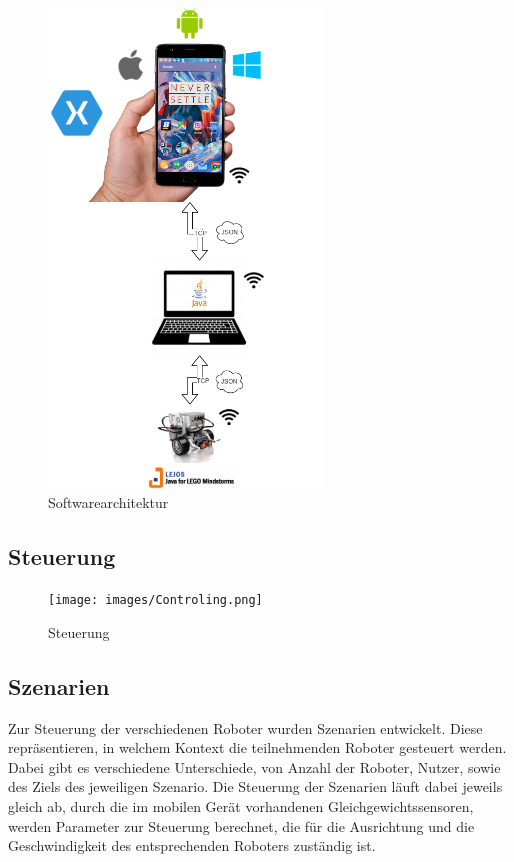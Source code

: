 \newpage
\begin{verbatim}
\end{verbatim}
\begin{figure}[h]
	\centering
	\includegraphics[width=0.65\textwidth]{images/konzeption/Softwarearchitecture.png}
	\caption{Softwarearchitektur}
	\label{fig:softwarearchitecture}
\end{figure}
\color{process}
\newpage
\subsection{Steuerung}

\begin{figure}[h]
	\centering
	\texttt{[image: images/Controling.png]}
	\caption{Steuerung}
	\label{fig:steuerung}
\end{figure}

\subsection{Szenarien}

Zur Steuerung der verschiedenen Roboter wurden Szenarien entwickelt. Diese repräsentieren, in welchem Kontext die teilnehmenden Roboter gesteuert werden. Dabei gibt es verschiedene Unterschiede, von Anzahl der Roboter, Nutzer, sowie des Ziels des jeweiligen Szenario. Die Steuerung der Szenarien läuft dabei jeweils gleich ab, durch die im mobilen Gerät vorhandenen Gleichgewichtssensoren, werden Parameter zur Steuerung berechnet, die für die Ausrichtung und die Geschwindigkeit des entsprechenden Roboters zuständig ist.



